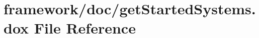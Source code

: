 \hypertarget{get_started_systems_8dox}{}\section{framework/doc/get\+Started\+Systems.dox File Reference}
\label{get_started_systems_8dox}
